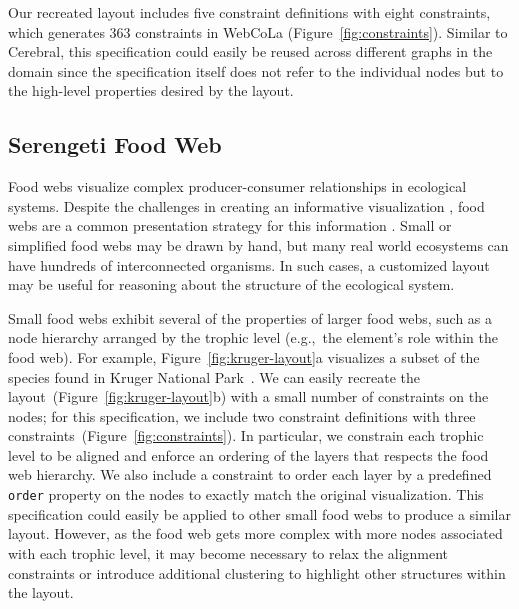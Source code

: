 Our recreated layout includes five constraint definitions with eight \projectname
constraints, which generates $363$ constraints in WebCoLa (Figure~\ref{fig:constraints}).
Similar to Cerebral, this \projectname specification could easily be reused 
across different graphs in the domain since the specification itself does
not refer to the individual nodes but to the high-level properties desired
by the layout.

\subsection{Serengeti Food Web}
\krugerLayout
\serengetiHybrid

Food webs visualize complex producer-consumer relationships in ecological
systems. Despite the challenges in creating an informative
visualization \cite{kearney2016blog}, food webs are a common presentation strategy for this information
\cite{hinke2004visualizing,harper2006dynamic,lavigne1996cod,baskerville2011spatial,yodzis1998local,cohen2003ecological,benson2016higher,kruger2017,kearney2013amplification,kearney2012coupling}.
Small or simplified food webs may be
drawn by hand, but many real world ecosystems can have hundreds of
interconnected organisms. In such cases, a customized layout may be useful
for reasoning about the structure of the ecological system.

Small food webs exhibit several of the properties of larger food webs, such
as a node hierarchy arranged by the trophic level (e.g.,~the element's 
role within the food web).
For example, Figure~\ref{fig:kruger-layout}a visualizes a subset of the
species found in Kruger National Park~\cite{kruger2017}. We can easily 
recreate the layout~(Figure~\ref{fig:kruger-layout}b) with a small 
number of constraints on the nodes; for this specification, we include 
two constraint definitions with three constraints~(Figure~\ref{fig:constraints}).
In particular, we constrain each trophic level to be aligned and enforce an
ordering of the layers that respects the food web hierarchy. We also
include a constraint to order each layer by a predefined \texttt{order} property
on the nodes to exactly match the original visualization. This \projectname specification 
could easily be applied to other small food webs to produce a similar layout.
However, as the food web gets more complex with more nodes associated with
each trophic level, it may become necessary to relax the alignment
constraints or introduce additional clustering to highlight other
structures within the layout.

